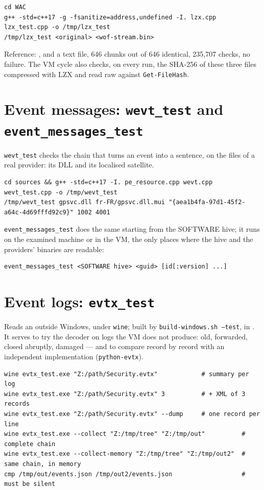 \documentclass[11pt,a4paper,oneside]{report}
\begin{document}
\begin{lstlisting}
cd WAC
g++ -std=c++17 -g -fsanitize=address,undefined -I. lzx.cpp lzx_test.cpp -o /tmp/lzx_test
/tmp/lzx_test <original> <wof-stream.bin>
\end{lstlisting}

Reference: ,  and a text file,
646 chunks out of 646 identical, 235,707 checks, no failure. The VM cycle also
checks, on every run, the SHA-256 of these three files compressed with LZX and
read raw against \texttt{Get-FileHash}.

\section{Event messages: \texttt{wevt\_test} and \texttt{event\_messages\_test}}

\texttt{wevt\_test} checks the chain that turns an event into a sentence, on the
files of a real provider: its DLL and its localised satellite.

\begin{lstlisting}
cd sources && g++ -std=c++17 -I. pe_resource.cpp wevt.cpp wevt_test.cpp -o /tmp/wevt_test
/tmp/wevt_test gpsvc.dll fr-FR/gpsvc.dll.mui "{aea1b4fa-97d1-45f2-a64c-4d69fffd92c9}" 1002 4001
\end{lstlisting}

\texttt{event\_messages\_test} does the same starting from the SOFTWARE hive; it
runs on the examined machine or in the VM, the only places where the hive and
the providers' binaries are readable:

\begin{lstlisting}
event_messages_test <SOFTWARE hive> <guid> [id[:version] ...]
\end{lstlisting}

\section{Event logs: \texttt{evtx\_test}}

Reads an  outside Windows, under \texttt{wine}; built by
\texttt{build-windows.sh --test}, in . It serves to try
the decoder on logs the VM does not produce: old, forwarded, closed abruptly,
damaged — and to compare record by record with an independent implementation
(\texttt{python-evtx}).

\begin{lstlisting}
wine evtx_test.exe "Z:/path/Security.evtx"            # summary per log
wine evtx_test.exe "Z:/path/Security.evtx" 3          # + XML of 3 records
wine evtx_test.exe "Z:/path/Security.evtx" --dump     # one record per line
wine evtx_test.exe --collect "Z:/tmp/tree" "Z:/tmp/out"          # complete chain
wine evtx_test.exe --collect-memory "Z:/tmp/tree" "Z:/tmp/out2"  # same chain, in memory
cmp /tmp/out/events.json /tmp/out2/events.json                   # must be silent
\end{lstlisting}
\end{document}
